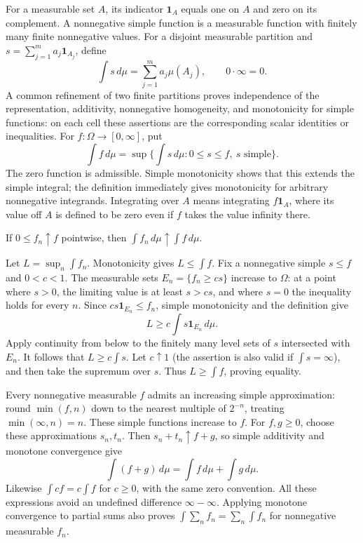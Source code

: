 For a measurable set $A$, its indicator $\mathbf1_A$ equals one on
$A$ and zero on its complement. A nonnegative simple function is a
measurable function with finitely many finite nonnegative values. For a disjoint measurable partition and
$s=\sum_{j=1}^m a_j\mathbf1_{A_j}$, define
\[
\int s\,d\mu=\sum_{j=1}^m a_j\mu(A_j),\qquad 0\cdot\infty=0.
\]
A common refinement of two finite partitions proves independence of the
representation, additivity, nonnegative homogeneity, and monotonicity for
simple functions: on each cell these assertions are the corresponding
scalar identities or inequalities. For $f:\Omega\to[0,\infty]$, put
\[
\int f\,d\mu=\sup\{\int s\,d\mu:0\leq s\leq f,
\ s\text{ simple}\}.
\]
The zero function is admissible. Simple monotonicity shows that this
extends the simple integral; the definition immediately gives monotonicity
for arbitrary nonnegative integrands. Integrating over $A$ means integrating
$f\mathbf1_A$, where its value off $A$ is defined to be zero even if
$f$ takes the value infinity there.

\begin{theorem}
\label{thm:monotone_convergence}
If $0\leq f_n\uparrow f$ pointwise, then
$\int f_n\,d\mu\uparrow\int f\,d\mu$.
\end{theorem}
\Proof
Let $L=\sup_n\int f_n$. Monotonicity gives $L\leq\int f$.
Fix a nonnegative simple $s\leq f$ and $0<c<1$. The measurable sets
$E_n=\{f_n\geq cs\}$ increase to $\Omega$: at a point where $s>0$,
the limiting value is at least $s>cs$, and where $s=0$ the inequality
holds for every $n$. Since $cs\mathbf1_{E_n}\leq f_n$, simple
monotonicity and the definition give
\[
L\geq c\int s\mathbf1_{E_n}\,d\mu.
\]
Apply continuity from below to the finitely many level sets of $s$
intersected with $E_n$. It follows that
$L\geq c\int s$. Let $c\uparrow1$ (the assertion is also valid if
$\int s=\infty$), and then take the supremum over $s$. Thus
$L\geq\int f$, proving equality.
\Done

Every nonnegative measurable $f$ admits an increasing simple approximation:
round $\min(f,n)$ down to the nearest multiple of $2^{-n}$, treating
$\min(\infty,n)=n$. These simple functions increase to $f$.
For $f,g\geq0$, choose these approximations $s_n,t_n$. Then
$s_n+t_n\uparrow f+g$, so simple additivity and monotone convergence give
\[
\int(f+g)\,d\mu=\int f\,d\mu+\int g\,d\mu.
\]
Likewise $\int cf=c\int f$ for $c\geq0$, with the same zero convention.
All these expressions avoid an undefined difference $\infty-\infty$.
Applying monotone convergence to partial sums also proves
$\int\sum_n f_n=\sum_n\int f_n$ for nonnegative measurable $f_n$.

